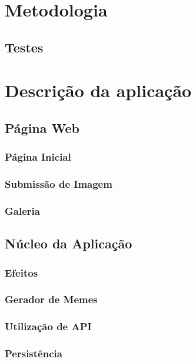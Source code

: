 \documentclass{report}
\begin{document}
\chapter{Metodologia}
\label{chap.metodologia}

\section{Testes}


\chapter{Descrição da aplicação}
\label{chap.desc}

\section{Página Web}


\subsection{Página Inicial}


\subsection{Submissão de Imagem}


\subsection{Galeria}

\section{Núcleo da Aplicação}

\subsection{Efeitos}

\subsection{Gerador de Memes}

\subsection{Utilização de API}

\subsection{Persistência}
\end{document}

